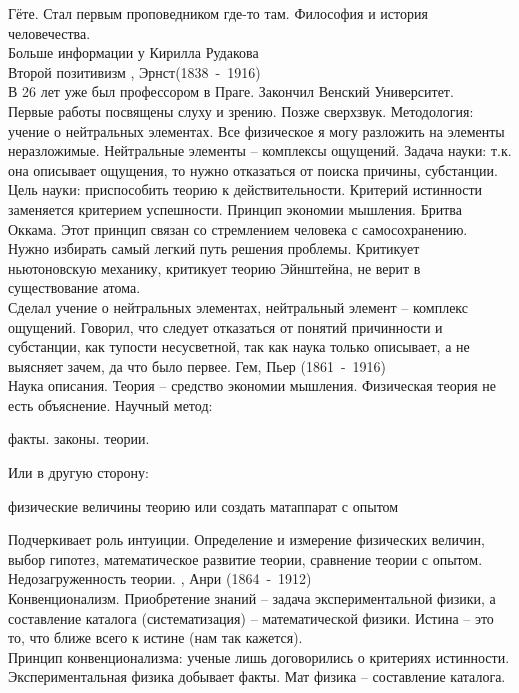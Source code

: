 \documentclass[a4paper,12pt]{report} %
\begin{document}
\begin{itemize}
Гёте. Стал первым проповедником где-то там. Философия и история
человечества.
\\Больше информации у Кирилла Рудакова\\
Второй позитивизм
, Эрнст(1838~-~1916)\\
В 26 лет уже был профессором в Праге. Закончил Венский Университет.\\
Первые работы посвящены слуху и зрению. Позже сверхзвук. Методология:
учение о нейтральных элементах. Все физическое я могу разложить на
элементы неразложимые. Нейтральные элементы -- комплексы
ощущений. Задача науки: т.к. она описывает ощущения, то нужно
отказаться от поиска причины, субстанции. Цель науки: приспособить
теорию к действительности. Критерий истинности заменяется критерием
успешности. Принцип экономии мышления. Бритва Оккама. Этот принцип
связан со стремлением человека с самосохранению. Нужно избирать самый
легкий путь решения проблемы. Критикует ньютоновскую механику,
критикует теорию Эйнштейна, не верит в существование атома.\\
Сделал  учение о нейтральных элементах, нейтральный элемент – комплекс ощущений.
Говорил, что следует отказаться от понятий причинности и субстанции, как тупости несусветной, так как наука только описывает, а не выясняет зачем, да что было первее. 
 Гем, Пьер (1861~-~1916)\\
Наука описания. Теория -- средство экономии мышления. Физическая
теория не есть объяснение. Научный метод:
\begin{enumerate}
 факты. 
 законы.
 теории.
\end{enumerate}
Или в другую сторону:
\begin{itemize}
 физические величины
 теорию
 или создать матаппарат
 с опытом
\end{itemize}
Подчеркивает роль интуиции. Определение и измерение физических
величин, выбор гипотез, математическое развитие теории, сравнение
теории с опытом. Недозагруженность теории.
, Анри (1864~-~1912)\\
Конвенционализм. Приобретение знаний -- задача экспериментальной
физики, а составление каталога (систематизация) -- математической
физики.
Истина -- это то, что ближе всего к истине (нам так кажется).\\
Принцип конвенционализма: ученые лишь договорились о критериях истинности. Экспериментальная физика добывает факты. Мат физика – составление каталога.
\end{itemize}
\end{document}
